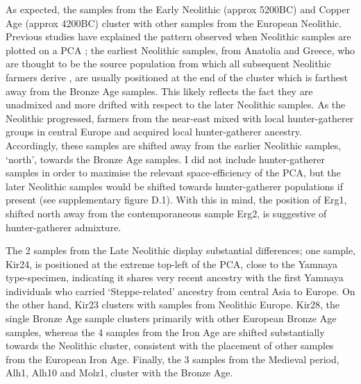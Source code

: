 As expected, the samples from the Early Neolithic (approx 5200BC) and Copper Age (approx 4200BC) cluster with other samples from the European Neolithic. Previous studies have explained the pattern observed when Neolithic samples are plotted on a PCA \cite{Lipson2017b}; the earliest Neolithic samples, from Anatolia and Greece, who are thought to be the source population from which all subsequent Neolithic farmers derive \cite{Hofmanova2016, Haak2010, haak2005ancient, bramanti2009genetic, Lazaridis2014}, are usually positioned at the end of the cluster which is farthest away from the Bronze Age samples. This likely reflects the fact they are unadmixed and more drifted with respect to the later Neolithic samples. As the Neolithic progressed, farmers from the near-east mixed with local hunter-gatherer groups in central Europe \cite{Lipson2017b} and acquired local hunter-gatherer ancestry. Accordingly, these samples are shifted away from the earlier Neolithic samples, `north', towards the Bronze Age samples. I did not include hunter-gatherer samples in order to maximise the relevant space-efficiency of the PCA, but the later Neolithic samples would be shifted towards hunter-gatherer populations if present (see supplementary figure D.1). With this in mind, the position of Erg1, shifted north away from the contemporaneous sample Erg2, is suggestive of hunter-gatherer admixture. 

The 2 samples from the Late Neolithic display substantial differences; one sample, Kir24, is  positioned at the extreme top-left of the PCA, close to the Yamnaya type-specimen, indicating it shares very recent ancestry with the first Yamnaya individuals who carried `Steppe-related' ancestry from central Asia to Europe. On the other hand, Kir23 clusters with samples from Neolithic Europe. Kir28, the single Bronze Age sample clusters primarily with other European Bronze Age samples, whereas the 4 samples from the Iron Age are shifted substantially towards the Neolithic cluster, consistent with the placement of other samples from the European Iron Age. Finally, the 3 samples from the Medieval period, Alh1, Alh10 and Molz1, cluster with the Bronze Age. 


